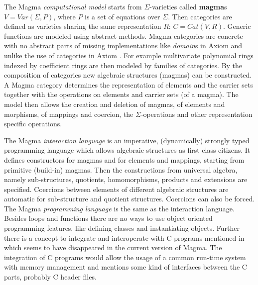 \documentclass{llncs}
\begin{document}
The Magma {\em computational model} starts from $\Sigma$-varieties
called {\bf magma}s $V = Var(\Sigma,P)$, where $P$ is a set of
equations over $\Sigma$. Then categories are defined as varieties
sharing the same representation $R$: $C = Cat(V,R)$. Generic functions
are modeled using abstract methods.
Magma categories are concrete with no abstract parts of missing
implementations like {\em domain}s in Axiom and unlike the use of
categories in Axiom \cite{JenksSutor:1992}.  For example multivariate
polynomial rings indexed by coefficient rings are then modeled by
families of categories.  By the composition of categories new algebraic
structures (magmas) can be constructed. A Magma category determines
the representation of elements and the carrier sets together with the
operations on elements and carrier sets (of a magma).
%
The model then allows the creation and deletion of magmas, of elements
and morphisms, of mappings and coercion, the $\Sigma$-operations and
other representation specific operations.

The Magma {\em interaction language} is an imperative, (dynamically)
strongly typed programming language which allows algebraic structures
as first class citizens. It defines constructors for magmas and for
elements and mappings, starting from primitive (build-in) magmas.
Then the constructions from universal algebra, namely sub-structures,
quotients, homomorphisms, products and extensions are specified.
Coercions between elements of different algebraic structures are
automatic for sub-structure and quotient structures.  Coercions can
also be forced. %
The Magma {\em programming language} is the same as the interaction
language. 
%
Besides loops and functions there are no ways to use object oriented
programming features, like defining classes and instantiating objects.
%
Further there is a concept to integrate and interoperate
with C programs mentioned in \cite{BosmaCannonMatthews:1994} which
seems to have disappeared in the current version of Magma.  The
integration of C programs would allow the usage of a common run-time
system with memory management and mentions some kind of interfaces
between the C parts, probably C header files.
\end{document}
